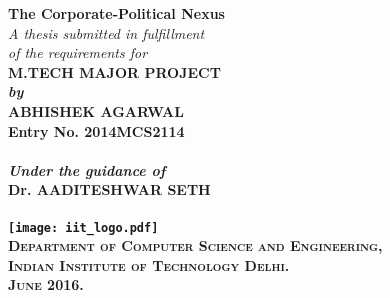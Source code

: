 \begin{titlepage}
\begin{center}

\LARGE{\textsf{\bfseries The Corporate-Political Nexus}}\\
\vspace{20pt}
\normalsize
\emph{A thesis submitted in fulfillment} \\
\emph{of the requirements for} \\
\vspace{20pt}
\bfseries M.TECH MAJOR PROJECT \\
\emph {by}\\
\vspace{20pt}
\Large{\textsf{\bfseries ABHISHEK AGARWAL}} \\
{\normalsize \textsf{\bfseries Entry No. 2014MCS2114}}\\

\ \\
{\normalsize \emph {Under the guidance of}}
\ \\
\Large{\textsf{\bfseries Dr. AADITESHWAR SETH}} \\
\ \\
\vspace{30pt}
\texttt{[image: iit\_logo.pdf]} \\
\vspace{10pt}
\large{\textsc{Department of Computer Science and Engineering,\\
Indian Institute of Technology Delhi.\\ June 2016.}}
\end{center}
\end{titlepage}
